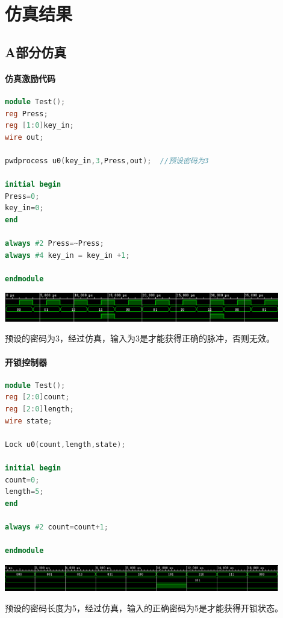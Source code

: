 \documentclass[a4paper,11pt]{ctexart}
\begin{document}
\section{仿真结果}
\subsection{A部分仿真}
\paragraph{仿真激励代码}
\begin{lstlisting}[language={verilog}]
module Test();
reg Press;
reg [1:0]key_in;
wire out;

pwdprocess u0(key_in,3,Press,out);  //预设密码为3

initial begin
Press=0;
key_in=0;
end

always #2 Press=~Press;
always #4 key_in = key_in +1;

endmodule
\end{lstlisting}
\includegraphics[width=0.9\textwidth]{./images/sim1.eps}

预设的密码为3，经过仿真，输入为3是才能获得正确的脉冲，否则无效。
\paragraph{开锁控制器}
\begin{lstlisting}[language={verilog}]
module Test();
reg [2:0]count;
reg [2:0]length;
wire state;

Lock u0(count,length,state);

initial begin
count=0;
length=5;
end

always #2 count=count+1;

endmodule
\end{lstlisting}
\includegraphics[width=0.9\textwidth]{./images/sim2.eps}

预设的密码长度为5，经过仿真，输入的正确密码为5是才能获得开锁状态。
\end{document}
